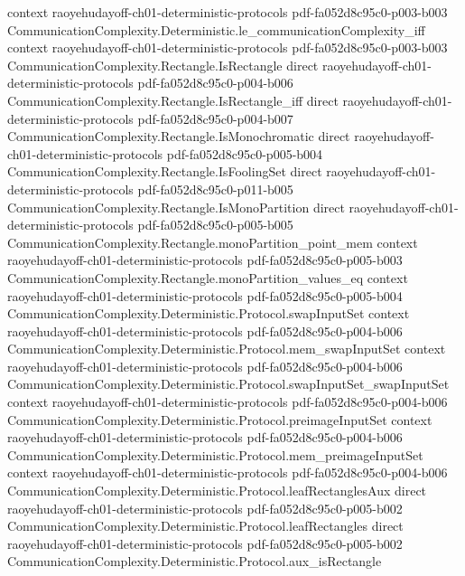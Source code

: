 \begin{theorem}
  {context}
  {raoyehudayoff-ch01-deterministic-protocols}
  {pdf-fa052d8c95c0-p003-b003}
\proofstep
  {CommunicationComplexity.Deterministic.le_communicationComplexity_iff}
  {context}
  {raoyehudayoff-ch01-deterministic-protocols}
  {pdf-fa052d8c95c0-p003-b003}
\proofstep
  {CommunicationComplexity.Rectangle.IsRectangle}
  {direct}
  {raoyehudayoff-ch01-deterministic-protocols}
  {pdf-fa052d8c95c0-p004-b006}
\proofstep
  {CommunicationComplexity.Rectangle.IsRectangle_iff}
  {direct}
  {raoyehudayoff-ch01-deterministic-protocols}
  {pdf-fa052d8c95c0-p004-b007}
\proofstep
  {CommunicationComplexity.Rectangle.IsMonochromatic}
  {direct}
  {raoyehudayoff-ch01-deterministic-protocols}
  {pdf-fa052d8c95c0-p005-b004}
\proofstep
  {CommunicationComplexity.Rectangle.IsFoolingSet}
  {direct}
  {raoyehudayoff-ch01-deterministic-protocols}
  {pdf-fa052d8c95c0-p011-b005}
\proofstep
  {CommunicationComplexity.Rectangle.IsMonoPartition}
  {direct}
  {raoyehudayoff-ch01-deterministic-protocols}
  {pdf-fa052d8c95c0-p005-b005}
\proofstep
  {CommunicationComplexity.Rectangle.monoPartition_point_mem}
  {context}
  {raoyehudayoff-ch01-deterministic-protocols}
  {pdf-fa052d8c95c0-p005-b003}
\proofstep
  {CommunicationComplexity.Rectangle.monoPartition_values_eq}
  {context}
  {raoyehudayoff-ch01-deterministic-protocols}
  {pdf-fa052d8c95c0-p005-b004}
\proofstep
  {CommunicationComplexity.Deterministic.Protocol.swapInputSet}
  {context}
  {raoyehudayoff-ch01-deterministic-protocols}
  {pdf-fa052d8c95c0-p004-b006}
\proofstep
  {CommunicationComplexity.Deterministic.Protocol.mem_swapInputSet}
  {context}
  {raoyehudayoff-ch01-deterministic-protocols}
  {pdf-fa052d8c95c0-p004-b006}
\proofstep
  {CommunicationComplexity.Deterministic.Protocol.swapInputSet_swapInputSet}
  {context}
  {raoyehudayoff-ch01-deterministic-protocols}
  {pdf-fa052d8c95c0-p004-b006}
\proofstep
  {CommunicationComplexity.Deterministic.Protocol.preimageInputSet}
  {context}
  {raoyehudayoff-ch01-deterministic-protocols}
  {pdf-fa052d8c95c0-p004-b006}
\proofstep
  {CommunicationComplexity.Deterministic.Protocol.mem_preimageInputSet}
  {context}
  {raoyehudayoff-ch01-deterministic-protocols}
  {pdf-fa052d8c95c0-p004-b006}
\proofstep
  {CommunicationComplexity.Deterministic.Protocol.leafRectanglesAux}
  {direct}
  {raoyehudayoff-ch01-deterministic-protocols}
  {pdf-fa052d8c95c0-p005-b002}
\proofstep
  {CommunicationComplexity.Deterministic.Protocol.leafRectangles}
  {direct}
  {raoyehudayoff-ch01-deterministic-protocols}
  {pdf-fa052d8c95c0-p005-b002}
\proofstep
  {CommunicationComplexity.Deterministic.Protocol.aux_isRectangle}

\end{theorem}
